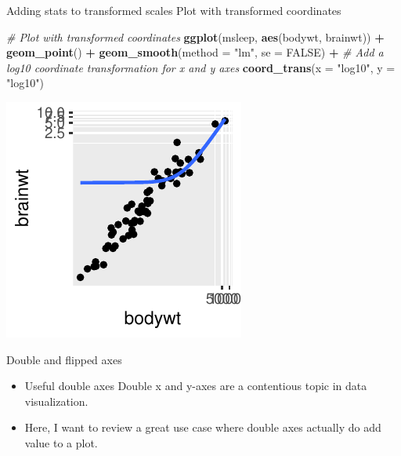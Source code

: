 \documentclass[
  ignorenonframetext,
]{beamer}
\newenvironment{Shaded}{\begin{snugshade}}{\end{snugshade}}
\newcommand{\AttributeTok}[1]{\textcolor[rgb]{0.13,0.29,0.53}{#1}}
\newcommand{\CommentTok}[1]{\textcolor[rgb]{0.56,0.35,0.01}{\textit{#1}}}
\newcommand{\ConstantTok}[1]{\textcolor[rgb]{0.56,0.35,0.01}{#1}}
\newcommand{\FunctionTok}[1]{\textcolor[rgb]{0.13,0.29,0.53}{\textbf{#1}}}
\newcommand{\NormalTok}[1]{#1}
\newcommand{\SpecialCharTok}[1]{\textcolor[rgb]{0.81,0.36,0.00}{\textbf{#1}}}
\newcommand{\StringTok}[1]{\textcolor[rgb]{0.31,0.60,0.02}{#1}}
\begin{document}
\begin{frame}[fragile]{Adding stats to transformed scales}
\label{adding-stats-to-transformed-scales-3}
Plot with transformed coordinates


\begin{Shaded}
\begin{Highlighting}[]
\CommentTok{\# Plot with transformed coordinates}
\FunctionTok{ggplot}\NormalTok{(msleep, }\FunctionTok{aes}\NormalTok{(bodywt, brainwt)) }\SpecialCharTok{+}
  \FunctionTok{geom\_point}\NormalTok{() }\SpecialCharTok{+}
  \FunctionTok{geom\_smooth}\NormalTok{(}\AttributeTok{method =} \StringTok{"lm"}\NormalTok{, }\AttributeTok{se =} \ConstantTok{FALSE}\NormalTok{) }\SpecialCharTok{+} \CommentTok{\# Add a log10 coordinate transformation for x and y axes}
  \FunctionTok{coord\_trans}\NormalTok{(}\AttributeTok{x =} \StringTok{"log10"}\NormalTok{, }\AttributeTok{y =} \StringTok{"log10"}\NormalTok{)}
\end{Highlighting}
\end{Shaded}

\begin{center}\includegraphics[width=0.5\linewidth]{Figs/unnamed-chunk-52-1} \end{center}
\end{frame}

\begin{frame}{Double and flipped axes}
\label{double-and-flipped-axes}
\begin{itemize}
\item
  Useful double axes Double x and y-axes are a contentious topic in data
  visualization.
\item
  Here, I want to review a great use case where double axes actually do
  add value to a plot.
\end{itemize}
\end{frame}
\end{document}
